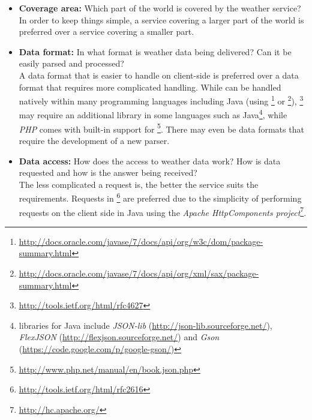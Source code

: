 \begin{itemize}
  \item \textbf{Coverage area:} Which part of the world is covered by the weather service?\\
  In order to keep things simple, a service covering a larger part of the world is preferred over a service covering a smaller part.
  
  \item \textbf{Data format:} In what format is weather data being delivered? Can it be easily parsed and processed?\\
  A data format that is easier to handle on client-side is preferred over a data format that requires more complicated handling. While \cite{XML} can be handled natively within many programming languages including Java (using \footnote{\href{http://docs.oracle.com/javase/7/docs/api/org/w3c/dom/package-summary.html}{http://docs.oracle.com/javase/7/docs/api/org/w3c/dom/package-summary.html}} or \footnote{\href{http://docs.oracle.com/javase/7/docs/api/org/xml/sax/package-summary.html}{http://docs.oracle.com/javase/7/docs/api/org/xml/sax/package-summary.html}}), \footnote{\href{http://tools.ietf.org/html/rfc4627}{http://tools.ietf.org/html/rfc4627}} may require an additional library in some languages such as Java\footnote{ libraries for Java include \emph{JSON-lib} (\href{http://json-lib.sourceforge.net/}{http://json-lib.sourceforge.net/}), \emph{FlexJSON} (\href{http://flexjson.sourceforge.net/}{http://flexjson.sourceforge.net/}) and \emph{Gson} (\href{https://code.google.com/p/google-gson/}{https://code.google.com/p/google-gson/})}, while \emph{PHP} comes with built-in support for \footnote{\href{http://www.php.net/manual/en/book.json.php}{http://www.php.net/manual/en/book.json.php}}. There may even be data formats that require the development of a new parser.
  
  \item \textbf{Data access:} How does the access to weather data work? How is data requested and how is the answer being received?\\
  The less complicated a request is, the better the service suits the requirements. Requests in \footnote{\href{http://tools.ietf.org/html/rfc2616}{http://tools.ietf.org/html/rfc2616}} are preferred due to the simplicity of performing requests on the client side in Java using the \emph{Apache HttpComponents project}\footnote{\href{http://hc.apache.org/}{http://hc.apache.org/}}.
  

\end{itemize}
